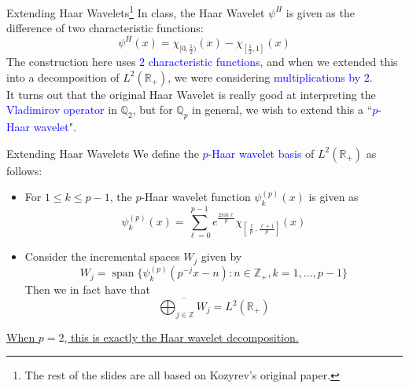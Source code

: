 \documentclass[hyperref, notheorems]{beamer}
\DeclareMathOperator{\spn}{\mathrm{span}}
\newcommand{\Rbb}{\mathbb{R}}
\newcommand{\Zbb}{\mathbb{Z}}
\newcommand{\Qbb}{\mathbb{Q}}
\newcommand{\txtblue}{\textcolor{blue}}
\theoremstyle{definition}
\begin{document}
\begin{frame}{Extending Haar Wavelets\footnote{The rest of the slides are all based on Kozyrev's original paper.}}
    In class, the Haar Wavelet $\psi^H$ is given as the difference of two characteristic functions:
    \[\psi^H(x) = \chi_{[0, \frac{1}{2})}(x) - \chi_{[\frac{1}{2}, 1]}(x)\]
    The construction here uses \txtblue{$2$ characteristic functions}, and when we extended this into a decomposition of $L^2(\Rbb_+)$, we were considering \txtblue{multiplications by $2$}.
    \vspace{\baselineskip}\\
    It turns out that the original Haar Wavelet is really good at interpreting the \txtblue{Vladimirov operator} in $\Qbb_2$, but for $\Qbb_p$ in general, we wish to extend this a ``\txtblue{$p$-Haar wavelet}".
\end{frame}

\begin{frame}{Extending Haar Wavelets}
    We define the \txtblue{$p$-Haar wavelet basis} of $L^2(\Rbb_+)$ as follows:
    \begin{itemize}
        \item For $1 \leq k \leq p - 1$, the $p$-Haar wavelet function $\psi_k^{(p)}(x)$ is given as
        \[\psi_k^{(p)}(x) = \sum_{\ell = 0}^{p-1} e^{\frac{2\pi i k \ell}{p}} \chi_{[\frac{\ell}{p}, \frac{\ell + 1}{p}]}(x)\]
        \item Consider the incremental spaces $W_j$ given by
        \[W_j = \spn\{\psi_k^{(p)}(p^{-j} x - n) : n \in \Zbb_+, k = 1, ..., p-1  \}\]
        Then we in fact have that
        \[\overline{\bigoplus_{j \in \Zbb} W_j} = L^2(\Rbb_+)\]
    \end{itemize}
\ul{When $p = 2$, this is exactly the Haar wavelet decomposition.}  
\end{frame}
\end{document}
